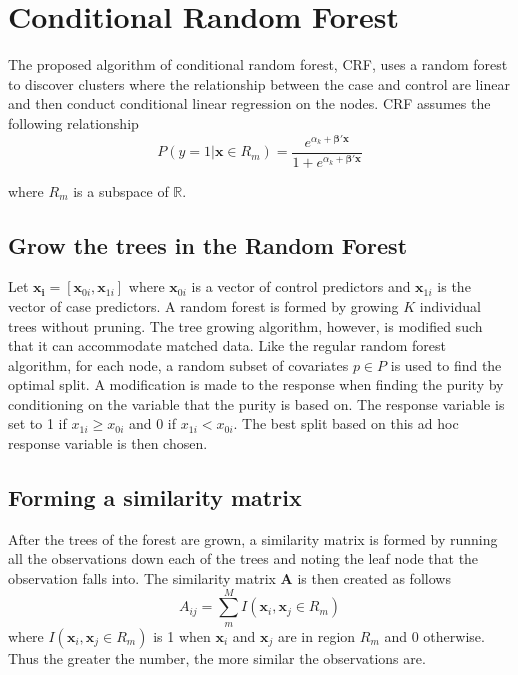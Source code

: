 \section{Conditional Random Forest}
The proposed algorithm of conditional random forest, CRF, uses a random forest to discover clusters where the relationship between the case and control are linear and then conduct conditional linear regression on the nodes. CRF assumes the following relationship
\begin{equation}
	P(y=1|\mathbf{x} \in R_m) = \frac{e^{\alpha_k + \mathbf{\beta}'\mathbf{x}}}{1+e^{\alpha_k + \mathbf{\beta}'\mathbf{x}}}
\end{equation}

where $R_m$ is a subspace of $\mathbb{R}$. 

\subsection{Grow the trees in the Random Forest}
Let $\mathbf{x_i}=[\mathbf{x}_{0i},\mathbf{x}_{1i}]$ where $\mathbf{x}_{0i}$ is a vector of control predictors and $\mathbf{x}_{1i}$ is the vector of case predictors. A random forest is formed by growing $K$ individual trees without pruning. The tree growing algorithm, however, is modified such that it can accommodate matched data. Like the regular random forest algorithm, for each node, a random subset of covariates $p\in P$ is used to find the optimal split. A modification is made to the response when finding the purity by conditioning on the variable that the purity is based on. The response variable is set to 1 if $x_{1i} \geq x_{0i}$ and 0 if $x_{1i} < x_{0i}$. The best split based on this ad hoc response variable is then chosen. 

\subsection{Forming a similarity matrix}
After the trees of the forest are grown, a similarity matrix is formed by running all the observations down each of the trees and noting the leaf node that the observation falls into. The similarity matrix $\mathbf{A}$ is then created as follows
\begin{equation}
	A_{ij}=\displaystyle\sum_m^M I(\mathbf{x}_i,\mathbf{x}_j \in R_m)
\end{equation}
where $I(\mathbf{x}_i,\mathbf{x}_j \in R_m)$ is 1 when $\mathbf{x}_i$ and $\mathbf{x}_j$ are in region $R_m$ and 0 otherwise. Thus the greater the number, the more similar the observations are. 


